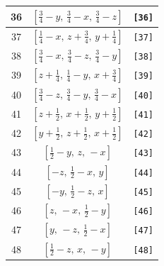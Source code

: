 \documentclass[fleqn,8pt]{jsarticle}
\begin{document}
\begin{longtable}{ccc}
36 & $\left[ \frac{3}{4} - y,\, \frac{3}{4} - x,\, \frac{3}{4} - z \right]$ & {\tt [36]} \\ \hline
37 & $\left[ \frac{1}{4} - x,\, z + \frac{3}{4},\, y + \frac{1}{4} \right]$ & {\tt [37]} \\ \hline
38 & $\left[ \frac{3}{4} - x,\, \frac{3}{4} - z,\, \frac{3}{4} - y \right]$ & {\tt [38]} \\ \hline
39 & $\left[ z + \frac{1}{4},\, \frac{1}{4} - y,\, x + \frac{3}{4} \right]$ & {\tt [39]} \\ \hline
40 & $\left[ \frac{3}{4} - z,\, \frac{3}{4} - y,\, \frac{3}{4} - x \right]$ & {\tt [40]} \\ \hline
41 & $\left[ z + \frac{1}{2},\, x + \frac{1}{2},\, y + \frac{1}{2} \right]$ & {\tt [41]} \\ \hline
42 & $\left[ y + \frac{1}{2},\, z + \frac{1}{2},\, x + \frac{1}{2} \right]$ & {\tt [42]} \\ \hline
43 & $\left[ \frac{1}{2} - y,\, z,\, - x \right]$ & {\tt [43]} \\ \hline
44 & $\left[ - z,\, \frac{1}{2} - x,\, y \right]$ & {\tt [44]} \\ \hline
45 & $\left[ - y,\, \frac{1}{2} - z,\, x \right]$ & {\tt [45]} \\ \hline
46 & $\left[ z,\, - x,\, \frac{1}{2} - y \right]$ & {\tt [46]} \\ \hline
47 & $\left[ y,\, - z,\, \frac{1}{2} - x \right]$ & {\tt [47]} \\ \hline
48 & $\left[ \frac{1}{2} - z,\, x,\, - y \right]$ & {\tt [48]} \\
\end{longtable}
\end{document}
